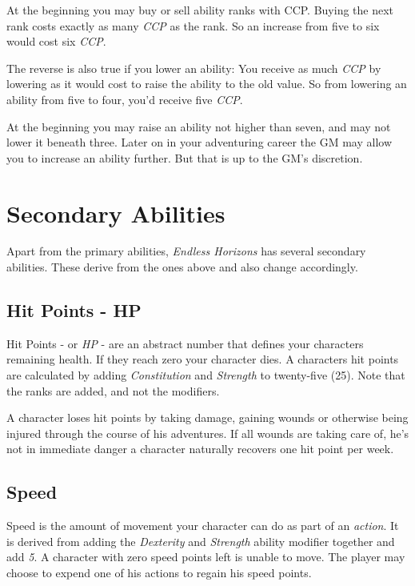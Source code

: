 At the beginning you may buy or sell ability ranks with CCP. Buying the next
rank costs exactly as many \emph{CCP} as the rank. So an increase from five to
six would cost six \emph{CCP}.

The reverse is also true if you lower an ability: You receive as much \emph{CCP}
by lowering as it would cost to raise the ability to the old value. So from
lowering an ability from five to four, you'd receive five \emph{CCP}.

At the beginning you may raise an ability not higher than seven, and may not
lower it beneath three. Later on in your adventuring career the GM may allow you
to increase an ability further. But that is up to the GM's discretion.

\section{Secondary Abilities}
\label{sec:2-Secondary Abilities}

Apart from the primary abilities, \emph{Endless Horizons} has several secondary
abilities. These derive from the ones above and also change accordingly.

\subsection{Hit Points - HP}
\label{sub:2-Hit Points}

Hit Points - or \emph{HP} - are an abstract number that defines your characters
remaining health. If they reach zero your character dies. A characters hit
points are calculated by adding \emph{Constitution} and \emph{Strength} to
twenty-five (25). Note that the ranks are added, and not the modifiers.

A character loses hit points by taking damage, gaining wounds or otherwise being
injured through the course of his adventures. If all wounds are taking care of,
he's not in immediate danger a character naturally recovers one hit point per
week.

\subsection{Speed}
\label{sub:2-Speed}

Speed is the amount of movement your character can do as part of an
\emph{action}. It is derived from adding the \emph{Dexterity} and
\emph{Strength} ability modifier together and add \emph{5}. A character with
zero speed points left is unable to move. The player may choose to expend one
of his actions to regain his speed points.

